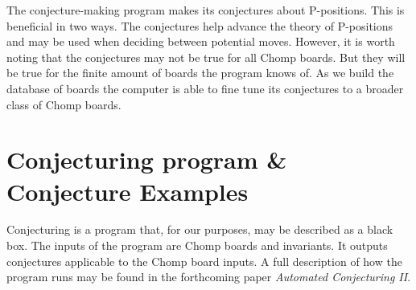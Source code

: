 \documentclass{amsart}
\theoremstyle{definition}
\theoremstyle{remark}
\numberwithin{equation}{section}
\begin{document}




The conjecture-making program makes its conjectures about P-positions.  This is beneficial in two ways.  The conjectures help advance the theory of P-positions and may be used when deciding between potential moves.  However, it is worth noting that the conjectures may not be true for all Chomp boards.  But they will be true for the finite amount of boards the program knows of.  As we build the database of boards the computer is able to fine tune its conjectures to a broader class of Chomp boards.







\section{Conjecturing program \& Conjecture Examples}
\label{conjecturing_basics}

Conjecturing is a program that, for our purposes, may be described as a black box.  The inputs of the program are Chomp boards and invariants.  It outputs conjectures applicable to the Chomp board inputs.  A full description of how the program runs may be found in the forthcoming paper \textit{Automated Conjecturing II}.
\end{document}
